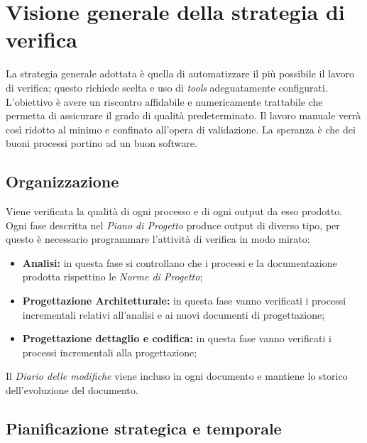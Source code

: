 \section{Visione generale della strategia di verifica}
La strategia generale adottata è quella di automatizzare il più possibile il lavoro di verifica; questo richiede scelta e uso di \emph{tools} adeguatamente configurati. L'obiettivo è avere un riscontro affidabile e numericamente trattabile che permetta di assicurare il grado di qualità predeterminato. Il lavoro manuale verrà così ridotto al minimo e confinato all'opera di validazione.
La speranza è che dei buoni processi portino ad un buon software.
	
	\subsection{Organizzazione}
	Viene verificata la qualità di ogni processo e di ogni output da esso prodotto. Ogni fase  descritta nel \emph{Piano di Progetto} produce output di diverso tipo, per questo è necessario programmare l'attività di verifica in modo mirato:

	\begin{itemize}
		\item \textbf{Analisi:} in questa fase si controllano che i processi e la documentazione prodotta rispettino le \emph{Norme di Progetto};
		\item \textbf{Progettazione Architetturale:} in questa fase vanno verificati i processi incrementali relativi all'analisi e ai nuovi documenti di progettazione;
		\item \textbf{Progettazione dettaglio e codifica:} in questa fase vanno verificati i processi incrementali alla progettazione;
	\end{itemize}
	
	Il \emph{Diario delle modifiche} viene incluso in ogni documento e mantiene lo storico dell'evoluzione del documento.
	
	\subsection{Pianificazione strategica e temporale}
